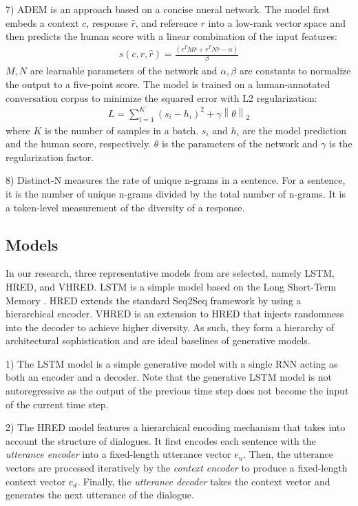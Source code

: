 \documentclass[runningheads]{llncs}
\begin{document}
7) ADEM \cite{ADEM} is an approach based on a concise nueral network. The model first embeds a context $c$, response $\hat{r}$, and reference $r$ into a low-rank vector space and then predicts the human score with a linear combination of the input features:
    \begin{align}
        s(c, r, \hat{r}) = \frac{(c^T M \hat{r} + r^T N \hat{r} - \alpha)}{\beta}
    \end{align}
    $M, N$ are learnable parameters of the network and $\alpha, \beta$ are constants to normalize the output to a five-point score. The model is trained on a human-annotated conversation corpus to minimize the squared error with L2 regularization:
    \begin{align}
        L = \sum_{i=1}^{K} (s_i - h_i)^2 + \gamma \left\| \theta \right\| _2
    \end{align}
    where $K$ is the number of samples in a batch. $s_i$ and $h_i$ are the model prediction and the human score, respectively. $\theta$ is the parameters of the network and $\gamma$ is the regularization factor.

8) Distinct-N \cite{MMI} measures the rate of unique n-grams in a sentence. For a sentence, it is the number of unique n-grams divided by the total number of n-grams. It is a token-level measurement of the diversity of a response.

\subsection{Models}
In our research, three representative models from \cite{VHRED} are selected, namely LSTM, HRED, and VHRED. LSTM is a simple model based on the Long Short-Term Memory \cite{LSTM}. HRED extends the standard Seq2Seq framework by using a hierarchical encoder. VHRED is an extension to HRED that injects randomness into the decoder to achieve higher diversity. As such, they form a hierarchy of architectural sophistication and are ideal baselines of generative models.

1) The LSTM model is a simple generative model with a single RNN acting as both an encoder and a decoder. Note that the generative LSTM model is not autoregressive as the output of the previous time step does not become the input of the current time step.

2) The HRED model \cite{hred-qs,HRED} features a hierarchical encoding mechanism that takes into account the structure of dialogues. It first encodes each sentence with the \emph{utterance encoder} into a fixed-length utterance vector $e_u$. Then, the utterance vectors are processed iteratively by the \emph{context encoder} to produce a fixed-length context vector $e_d$. Finally, the \emph{utterance decoder} takes the context vector and generates the next utterance of the dialogue.
\end{document}
